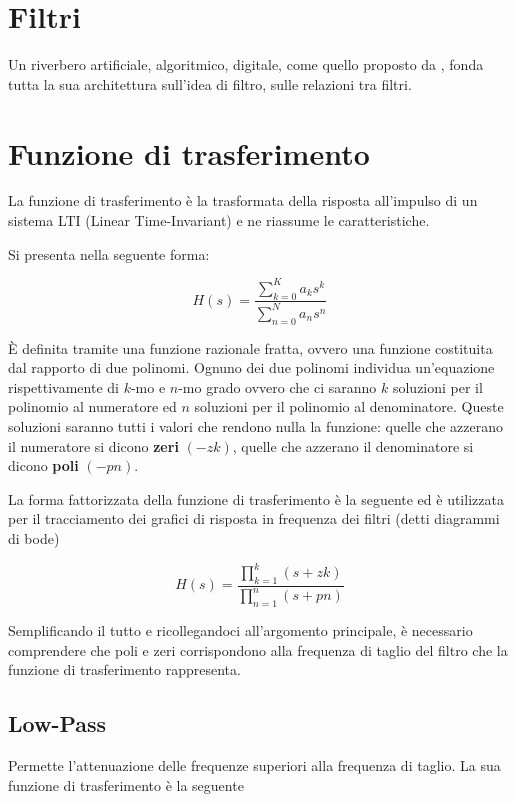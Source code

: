 \section{Filtri}

Un riverbero artificiale, algoritmico, digitale, come quello proposto da \ms,
fonda tutta la sua architettura sull'idea di filtro, sulle relazioni tra filtri.

\section{Funzione di trasferimento}

La funzione di trasferimento è la trasformata della risposta all’impulso di un
sistema LTI (Linear Time-Invariant) e ne riassume le caratteristiche.

Si presenta nella seguente forma:

\begin{equation}
H(s)=\frac{\sum_{k=0}^K a_k s^k}{\sum_{n=0}^N a_n s^n}
\end{equation}

È definita tramite una funzione razionale fratta, ovvero una funzione costituita
dal rapporto di due polinomi. Ognuno dei due polinomi individua un’equazione
rispettivamente di $k$-mo e $n$-mo grado ovvero che ci saranno $k$ soluzioni
per il polinomio al numeratore ed $n$ soluzioni per il polinomio al denominatore.
Queste soluzioni saranno tutti i valori che rendono nulla la funzione:
quelle che azzerano il numeratore si dicono \textbf{zeri} $(-zk)$, quelle che
azzerano il denominatore si dicono \textbf{poli} $(-pn)$.

La forma fattorizzata della funzione di trasferimento è la seguente ed è
utilizzata per il tracciamento dei grafici di risposta in frequenza dei filtri
(detti diagrammi di bode)

\begin{equation}
H(s)=\frac{\prod_{k=1}^k (s+zk)}{\prod_{n=1}^n (s+pn)}
\end{equation}

Semplificando il tutto e ricollegandoci all’argomento principale, è necessario
comprendere che poli e zeri corrispondono alla frequenza di taglio del filtro
che la funzione di trasferimento rappresenta.

\subsection{Low-Pass}

Permette l’attenuazione delle frequenze superiori alla frequenza di taglio.
La sua funzione di trasferimento è la seguente

